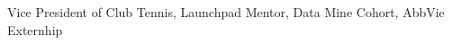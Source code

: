 
\cventry
    {} %
    {} %
    {} %
    {} %
    {
    {Vice President of Club Tennis, Launchpad Mentor, Data Mine Cohort, AbbVie Externhip }
    }
